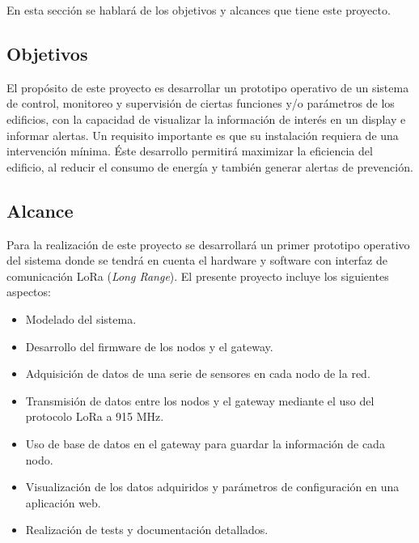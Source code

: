 En esta sección se hablará de los objetivos y alcances que tiene este proyecto.

\subsection{Objetivos}

El propósito de este proyecto es desarrollar un prototipo operativo de un sistema de control, monitoreo y supervisión de ciertas funciones y/o parámetros de los edificios, con la capacidad de visualizar la información de interés en un display e informar alertas. Un requisito importante es que su instalación requiera de una intervención mínima. Éste desarrollo permitirá maximizar la eficiencia del edificio, al reducir el consumo de energía y también generar alertas de prevención.

\subsection{Alcance}

Para la realización de este proyecto se desarrollará un primer prototipo operativo del sistema donde se tendrá en cuenta el hardware y software con interfaz de comunicación LoRa ({\textit{Long Range}}). El presente proyecto incluye los siguientes aspectos:

\begin{itemize}
\item Modelado del sistema.
\item Desarrollo del firmware de los nodos y el gateway.
\item Adquisición de datos de una serie de sensores en cada nodo de la red.
\item Transmisión de datos entre los nodos y el gateway mediante el uso del protocolo LoRa a 915 MHz.
\item Uso de base de datos en el gateway para guardar la información de cada nodo.
\item Visualización de los datos adquiridos y parámetros de configuración en una aplicación web.
\item Realización de tests y documentación detallados.
\end{itemize}



